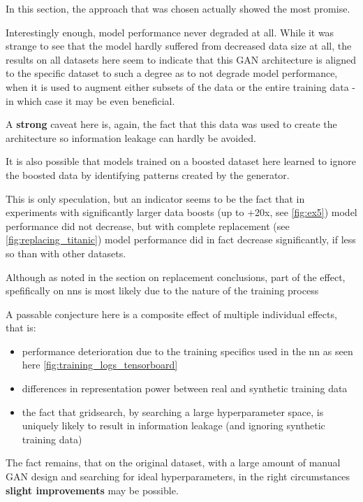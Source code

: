 In this section, the approach that was chosen actually showed the most promise. 

Interestingly enough, model performance never degraded at all. While it was strange to see that the model hardly suffered from decreased data size at all, the results on all datasets here seem to indicate that this \ac{GAN} architecture is aligned to the specific dataset to such a degree as to not degrade model performance, when it is used to augment either subsets of the data or the entire training data - in which case it may be even beneficial.

A \textbf{strong} caveat here is, again, the fact that this data was used to create the architecture so information leakage can hardly be avoided.

It is also possible that models trained on a boosted dataset here learned to ignore the boosted data by identifying patterns created by the generator. 

This is only speculation, but an indicator seems to be the fact that in experiments with significantly larger data boosts (up to +20x, see \ref{fig:ex5}) model performance did not decrease, but with complete replacement (see \ref{fig:replacing_titanic}) model performance did in fact decrease significantly, if less so than with other datasets. 

Although as noted in the section on replacement conclusions, part of the effect, spefifically on \acp{nn} is most likely due to the nature of the training process

\pagebreak

A passable conjecture here is a composite effect of multiple individual effects, that is: 

\begin{itemize}
	\item performance deterioration due to the training specifics used in the \ac{nn} as seen here \ref{fig:training_logs_tensorboard}
	\item differences in representation power between real and synthetic training data
	\item the fact that gridsearch, by searching a large hyperparameter space, is uniquely likely to result in information leakage (and ignoring synthetic training data)
\end{itemize}

The fact remains, that on the original dataset, with a large amount of manual \ac{GAN} design and searching for ideal hyperparameters, in the right circumstances \textbf{slight improvements} may be possible.

